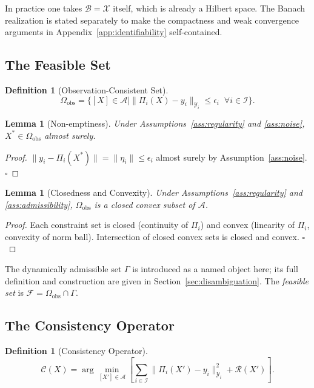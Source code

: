 \documentclass[11pt, oneside]{article}
\newtheorem{lemma}[theorem]{Lemma}
\newtheorem{definition}[theorem]{Definition}
\begin{document}
In practice one takes $\mathcal{B} = \mathcal{X}$ itself, which is already a Hilbert
space. The Banach realization is stated separately to make the compactness and weak
convergence arguments in Appendix~\ref{app:identifiability} self-contained.

\subsection{The Feasible Set}

\begin{definition}[Observation-Consistent Set]
\[
\Omega_{\mathrm{obs}} = \{ [X] \in \mathcal{A} \mid
\|\Pi_i(X) - y_i\|_{\mathcal{Y}_i} \le \epsilon_i \;\; \forall i \in \mathcal{I} \}.
\]
\end{definition}

\begin{lemma}[Non-emptiness]
Under Assumptions~\ref{ass:regularity} and \ref{ass:noise}, $X^* \in \Omega_{\mathrm{obs}}$
almost surely.
\end{lemma}
\begin{proof}
$\|y_i - \Pi_i(X^*)\| = \|\eta_i\| \le \epsilon_i$ almost surely by Assumption~\ref{ass:noise}.
$\square$
\end{proof}

\begin{lemma}[Closedness and Convexity]
Under Assumptions~\ref{ass:regularity} and \ref{ass:admissibility},
$\Omega_{\mathrm{obs}}$ is a closed convex subset of $\mathcal{A}$.
\end{lemma}
\begin{proof}
Each constraint set is closed (continuity of $\Pi_i$) and convex (linearity of $\Pi_i$,
convexity of norm ball). Intersection of closed convex sets is closed and convex.
$\square$
\end{proof}

The dynamically admissible set $\Gamma$ is introduced as a named object here; its full
definition and construction are given in Section~\ref{sec:disambiguation}. The
\emph{feasible set} is $\mathcal{F} = \Omega_{\mathrm{obs}} \cap \Gamma$.

\subsection{The Consistency Operator}

\begin{definition}[Consistency Operator]
\[
\mathcal{C}(X) = \arg\min_{[X'] \in \mathcal{A}}
\left[ \sum_{i \in \mathcal{I}} \|\Pi_i(X') - y_i\|_{\mathcal{Y}_i}^2
+ \mathcal{R}(X') \right].
\]
\end{definition}
\end{document}
